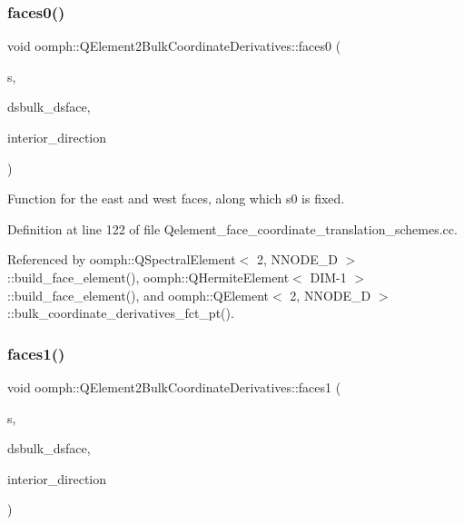 \subsubsection{\texorpdfstring{faces0()}{faces0()}}
{\footnotesize\ttfamily void oomph\+::\+Q\+Element2\+Bulk\+Coordinate\+Derivatives\+::faces0 (\begin{DoxyParamCaption}\item[{const \hyperlink{classoomph_1_1Vector}{Vector}$<$ double $>$ \&}]{s,  }\item[{\hyperlink{classoomph_1_1DenseMatrix}{Dense\+Matrix}$<$ double $>$ \&}]{dsbulk\+\_\+dsface,  }\item[{unsigned \&}]{interior\+\_\+direction }\end{DoxyParamCaption})}



Function for the east and west faces, along which s0 is fixed. 



Definition at line 122 of file Qelement\+\_\+face\+\_\+coordinate\+\_\+translation\+\_\+schemes.\+cc.



Referenced by oomph\+::\+Q\+Spectral\+Element$<$ 2, N\+N\+O\+D\+E\+\_\+D $>$\+::build\+\_\+face\+\_\+element(), oomph\+::\+Q\+Hermite\+Element$<$ D\+I\+M-\/1 $>$\+::build\+\_\+face\+\_\+element(), and oomph\+::\+Q\+Element$<$ 2, N\+N\+O\+D\+E\+\_\+D $>$\+::bulk\+\_\+coordinate\+\_\+derivatives\+\_\+fct\+\_\+pt().

\mbox{\label{namespaceoomph_1_1QElement2BulkCoordinateDerivatives_a07953f5dbe4f1e51b98e2a37282c3458}} 
\subsubsection{\texorpdfstring{faces1()}{faces1()}}
{\footnotesize\ttfamily void oomph\+::\+Q\+Element2\+Bulk\+Coordinate\+Derivatives\+::faces1 (\begin{DoxyParamCaption}\item[{const \hyperlink{classoomph_1_1Vector}{Vector}$<$ double $>$ \&}]{s,  }\item[{\hyperlink{classoomph_1_1DenseMatrix}{Dense\+Matrix}$<$ double $>$ \&}]{dsbulk\+\_\+dsface,  }\item[{unsigned \&}]{interior\+\_\+direction }\end{DoxyParamCaption})}



